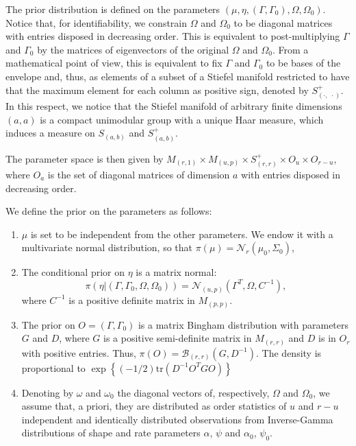 \documentclass[graybox]{svmult}
\begin{document}
The prior distribution is defined on the parameters
$\left( \mu, \eta, \left(\Gamma, \Gamma_0\right), \Omega, \Omega_0
\right)$. Notice that, for identifiability, we constrain $\Omega$ and
$\Omega_0$ to be diagonal matrices with entries disposed in decreasing
order. This is equivalent to post-multiplying $\Gamma$ and $\Gamma_0$
by the matrices of eigenvectors of the original $\Omega$ and
$\Omega_0$. From a mathematical point of view, this is equivalent to
fix $\Gamma$ and $\Gamma_0$ to be bases of the envelope and, thus, as
elements of a subset of a Stiefel manifold restricted to have that the
maximum element for each column as positive sign, denoted by
$S^+_{\left( \cdot,\; \cdot \right)}$. In this respect, we notice that
the Stiefel manifold of arbitrary finite dimensions
$\left( a, a \right)$ is a compact unimodular group with a unique Haar
measure, which induces a measure on $S_{\left( a, b\right)}$ and
$S^+_{\left( a, b \right)}$.

The parameter space is then given by
$M_{\left( r, 1 \right)} \times M_{\left( u, p \right)}\times
S^+_{\left( r, r \right)} \times O_u \times O_{r -u} $, where $O_a$ is
the set of diagonal matrices of dimension $a$ with entries disposed in
decreasing order.

We define the prior on the parameters as follows:

\begin{enumerate}
\item $\mu$ is set to be independent from the other parameters. We endow it with a multivariate normal distribution, so that $\pi \left( \mu \right) = \mathcal{N}_r \left( \mu_0, \Sigma_0 \right)$,
\item The conditional prior on $\eta$ is a matrix normal: $$\pi \left( \eta | \left( \Gamma, \Gamma_0, \Omega, \Omega_0 \right) \right) = \mathcal{N}_{\left( u, p \right)}\left( \Gamma^T, \Omega, C^{-1} \right),$$ where $C^{-1}$ is a positive definite matrix in $M_{\left( p, p \right)}$.
\item The prior on $O = \left( \Gamma, \Gamma_0 \right)$ is a matrix Bingham distribution with parameters $G$ and $D$, where $G$ is a positive semi-definite matrix in $M_{\left( r, r \right)}$ and $D$ is in $O_r$ with positive entries. Thus, $\pi \left( O \right) = \mathcal{B}_{\left( r, r \right)}\left( G, D^{-1} \right)$. The density is proportional to $\exp{\left\{ \left(-1/2\right) \mathrm{tr}\left( D^{-1}O^TGO\right) \right\}}$
\item Denoting by $\omega$ and $\omega_0$ the diagonal vectors of, respectively, $\Omega$ and $\Omega_0$, we assume that, a priori, they are distributed as order statistics of $u$ and $r - u$ independent and identically distributed observations from Inverse-Gamma distributions of shape and rate parameters $\alpha$, $\psi$ and $\alpha_0$, $\psi_0$.
\end{enumerate}
\end{document}
